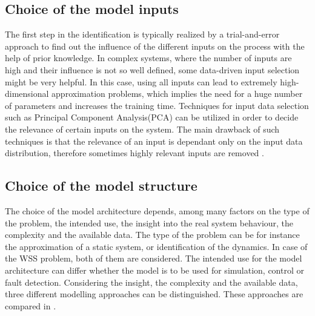 \vspace{-5mm}

\subsection{Choice of the model inputs}
\label{choice_of_the_model_inputs}

The first step in the identification is typically realized by a trial-and-error approach to find out the influence of the different inputs on the process with the help of prior knowledge. In complex systems, where the number of inputs are high and their influence is not so well defined, some data-driven input selection might be very helpful. In this case, using all inputs can lead to extremely high-dimensional approximation problems, which implies the need for a huge number of parameters and increases the training time. Techniques for input data selection such as Principal Component Analysis(PCA) can be utilized in order to decide the relevance of certain inputs on the system. The main drawback of such techniques is that the relevance of an input is dependant only on the input data distribution, therefore sometimes highly relevant inputs are removed \cite{nelles2013nonlinear}. 

\subsection{Choice of the model structure}
\label{choice_of_the_model_architecture}

The choice of the model architecture depends, among many factors on the type of the problem, the intended use, the insight into the real system behaviour, the complexity and the available data. The type of the problem can be for instance the approximation of a static system, or identification of the dynamics. In case of the WSS problem, both of them are considered. The intended use for the model architecture can differ whether the model is to be used for simulation, control or fault detection. Considering the insight, the complexity and the available data, three different modelling approaches can be distinguished\cite{nelles2013nonlinear}. These approaches are compared in . 

\vspace{-3mm}

